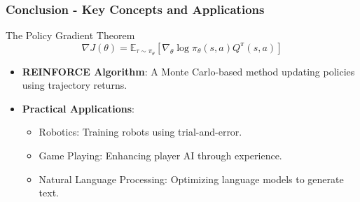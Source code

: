 \documentclass[aspectratio=169]{beamer}
\begin{document}
\begin{frame}[fragile]
    \frametitle{Conclusion - Key Concepts and Applications}
    
    \begin{block}{The Policy Gradient Theorem}
        \begin{equation}
            \nabla J(\theta) = \mathbb{E}_{\tau \sim \pi_{\theta}} \left[ \nabla_{\theta} \log \pi_{\theta}(s, a) Q^{\pi}(s, a) \right]
        \end{equation}
    \end{block}
    
    \begin{itemize}
        \item \textbf{REINFORCE Algorithm}: A Monte Carlo-based method updating policies using trajectory returns.
        \item \textbf{Practical Applications}:
            \begin{itemize}
                \item Robotics: Training robots using trial-and-error.
                \item Game Playing: Enhancing player AI through experience.
                \item Natural Language Processing: Optimizing language models to generate text.
            \end{itemize} 
    \end{itemize}

\end{frame}
\end{document}
